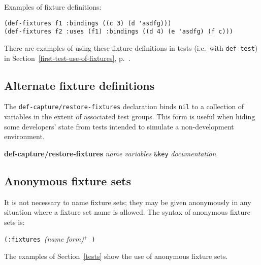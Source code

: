 \documentclass{article}
\begin{document}
Examples of fixture definitions:
\begin{verbatim}
(def-fixtures f1 :bindings ((c 3) (d 'asdfg)))
(def-fixtures f2 :uses (f1) :bindings ((d 4) (e 'asdfg) (f c)))
\end{verbatim}
There are examples of using these fixture definitions in tests (i.e.\
with \texttt{def-test}) in Section~\ref{first-test-use-of-fixtures},
p.~\pageref{first-test-use-of-fixtures}.

\subsection{Alternate fixture definitions}
The
\texttt{def-capture/restore-fixtures}
declaration binds \texttt{nil} to a collection of variables in the
extent of associated test groups.  This form is useful when hiding
some developers' state from tests intended to simulate a
non-development environment.
\begin{center}
\textbf{def-capture/restore-fixtures}
 \textit{name} \textit{variables}
\texttt{\&key} \textit{documentation}
\end{center}

\subsection{Anonymous fixture sets}
It is not necessary to name fixture sets; they may be given
anonymously in any situation where a fixture set name is allowed.  The
syntax of anonymous fixture sets
is:
\begin{center}
\texttt{(:fixtures }\textit{(name form)}$^+$\texttt{ )}
\end{center}
The examples of Section~\ref{tests} show the use of anonymous fixture
sets.
\end{document}
